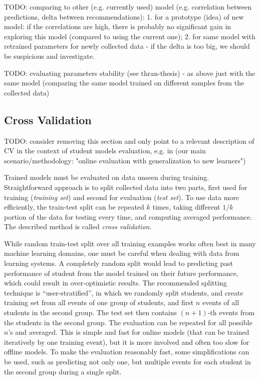 TODO: comparing to other (e.g. currently used) model (e.g. correlation between predictions, delta between recommendations):
1. for a prototype (idea) of new model: if the correlations are high, there is probably no significant gain in exploring this model (compared to using the current one);
2. for same model with retrained parameters for newly collected data - if the delta is too big, we should be suspicious and investigate.

TODO: evaluating parameters stability (see thran-thesis) - as above just with the same model (comparing the same model trained on different samples from the collected data)

\subsection{Cross Validation}

TODO: consider removing this section and only point to a relevant description
of CV in the context of student models evaluation, e.g. in \cite{pelanek-learner-modeling}
(our main scenario/methodology: "online evaluation with generalization to new learners")

Trained models must be evaluated on data unseen during training.
Straightforward approach is to split collected data into two parts,
  first used for training (\emph{training set})
  and second for evaluation (\emph{test set}).
To use data more efficiently, the train-test split can be repeated
  $k$ times, taking different $1/k$ portion of the data for testing every time,
  and computing averaged performance.
The described method is called \emph{cross validation}.

While random train-test split over all training examples works often
  best in many machine learning domains,
  one must be careful when dealing with data from learning systems.
A completely random split would lead to predicting past performance
  of student from the model trained on their future performance,
  which could result in over-optimistic results.
The recommended splitting technique is ``user-stratified'',
  in which we randomly split students,
  and create training set from all events of one group of students,
  and first $n$ events of all students in the second group.
The test set then contains $(n+1)$-th events from the students
  in the second group.
The evaluation can be repeated for all possible $n$'s and averaged.
This is simple and fast for online models
  (that can be trained iteratively by one training event),
  but it is more involved and often too slow for offline models.
To make the evaluation reasonably fast,
  some simplifications can be used,
  such as predicting not only one, but multiple events
  for each student in the second group during a single split.

